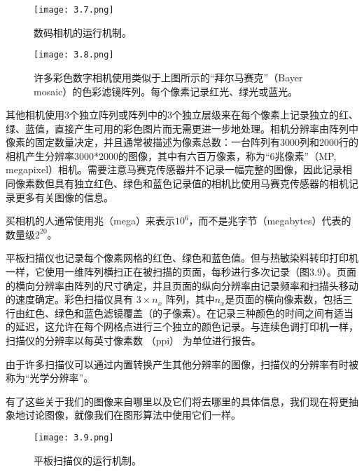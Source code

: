 \documentclass[lang=cn,12pt]{elegantbook}
\begin{document}
\begin{figure}[htb]
  \centering
  \begin{minipage}[t]{0.45\textwidth}
  \centering
  \texttt{[image: 3.7.png]}
  \caption{数码相机的运行机制。}
  \end{minipage}
  \begin{minipage}[t]{0.45\textwidth}
  \centering
  \texttt{[image: 3.8.png]}
  \caption{许多彩色数字相机使用类似于上图所示的“拜尔马赛克”（Bayer mosaic）的色彩滤镜阵列。每个像素记录红光、绿光或蓝光。}
  \end{minipage}
\end{figure}

其他相机使用3个独立阵列或阵列中的3个独立层级来在每个像素上记录独立的红、绿、蓝值，直接产生可用的彩色图片而无需更进一步地处理。相机分辨率由阵列中像素的固定数量决定，并且通常被描述为像素总数：一台阵列有3000列和2000行的相机产生分辨率3000*2000的图像，其中有六百万像素，称为“6兆像素”（MP, megapixel）相机。需要注意马赛克传感器并不记录一幅完整的图像，因此记录相同像素数但具有独立红色、绿色和蓝色记录值的相机比使用马赛克传感器的相机记录更多有关图像的信息。

\begin{note}
买相机的人通常使用兆（mega）来表示$10^6$，而不是兆字节（megabytes）代表的数量级$2^{20}$。
\end{note}

平板扫描仪也记录每个像素网格的红色、绿色和蓝色值。但与热敏染料转印打印机一样，它使用一维阵列横扫正在被扫描的页面，每秒进行多次记录（图3.9）。页面的横向分辨率由阵列的尺寸确定，并且页面的纵向分辨率由记录频率和扫描头移动的速度确定。彩色扫描仪具有 $3\times n_x$ 阵列，其中$n_x$是页面的横向像素数，包括三行由红色、绿色和蓝色滤镜覆盖（的子像素）。在记录三种颜色的时间之间有适当的延迟，这允许在每个网格点进行三个独立的颜色记录。与连续色调打印机一样，扫描仪的分辨率以每英寸像素数 （ppi） 为单位进行报告。

\begin{note}
由于许多扫描仪可以通过内置转换产生其他分辨率的图像，扫描仪的分辨率有时被称为“光学分辨率”。
\end{note}

有了这些关于我们的图像来自哪里以及它们将去哪里的具体信息，我们现在将更抽象地讨论图像，就像我们在图形算法中使用它们一样。

\begin{figure}[htb]
  \centering
  \texttt{[image: 3.9.png]}
  \caption{平板扫描仪的运行机制。}
\end{figure}
\end{document}
